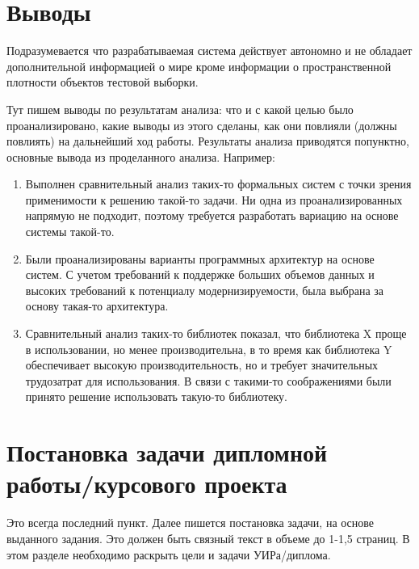 \section{Выводы}

Подразумевается что разрабатываемая система действует автономно и не обладает дополнительной информацией о мире кроме информации о пространственной плотности объектов тестовой выборки.

Тут пишем выводы по результатам анализа: что и с какой целью было проанализировано, какие выводы из этого сделаны, как они повлияли (должны повлиять) на дальнейший ход работы. Результаты анализа приводятся попунктно, основные вывода из проделанного анализа. Например:

\begin{enumerate}
	\item Выполнен сравнительный анализ таких-то формальных систем с точки зрения применимости к решению такой-то задачи. Ни одна из проанализированных напрямую не подходит, поэтому требуется разработать вариацию на основе системы такой-то.
	\item Были проанализированы варианты программных архитектур на основе систем. С учетом требований к поддержке больших объемов данных и высоких требований к потенциалу модернизируемости, была выбрана за основу такая-то архитектура.
	\item Сравнительный анализ таких-то библиотек показал, что библиотека X проще в использовании, но менее производительна, в то время как библиотека Y обеспечивает высокую производительность, но и требует значительных трудозатрат для использования. В связи с такими-то соображениями были принято решение использовать такую-то библиотеку.
\end{enumerate}



\section{Постановка задачи дипломной работы/курсового проекта}

Это всегда последний пункт. Далее пишется постановка задачи, на основе выданного задания. Это должен быть связный текст в объеме до 1-1,5 страниц. В этом разделе необходимо раскрыть цели и задачи УИРа/диплома. 

